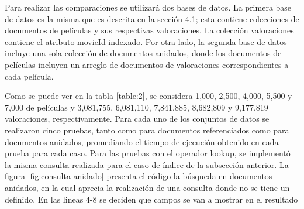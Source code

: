 \documentclass[conference,compsoc]{sty/IEEEtran}
\begin{document}


Para realizar las comparaciones se utilizará dos bases de datos. La primera base de datos es la misma que es descrita en la sección 4.1; esta contiene colecciones de documentos de películas y sus respectivas valoraciones. La colección valoraciones contiene el atributo movieId indexado. Por otra lado, la segunda base de datos incluye una sola colección de documentos anidados, donde los documentos de películas incluyen un arreglo de documentos de valoraciones correspondientes a cada película.  %

Como se puede ver en la tabla \ref{table:2}, se considera 1,000, 2,500, 4,000, 5,500 y 7,000 de películas y 3,081,755, 6,081,110, 7,841,885, 8,682,809 y 9,177,819 valoraciones, respectivamente. Para cada uno de los conjuntos de datos se realizaron cinco pruebas, tanto como para documentos referenciados como para documentos anidados, promediando el tiempo de ejecución obtenido en cada prueba para cada caso. Para las pruebas con el operador lookup, se implementó la misma consulta realizada para el caso de índice de la subsección anterior. La figura \ref{fig:consulta-anidado} presenta el código la búsqueda en documentos anidados, en la cual aprecia la realización de una consulta donde no se tiene un  definido. En las lineas 4-8 se deciden que campos se van a mostrar en el resultado

\end{document}
